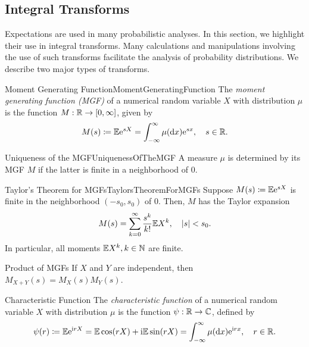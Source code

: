 \subsection{Integral Transforms}
Expectations are used in many probabilistic analyses. In this section, we highlight their use in integral transforms. Many calculations and manipulations involving the use of such transforms facilitate the analysis of probability distributions. We describe two major types of transforms.

\begin{defn}{Moment Generating Function}{MomentGeneratingFunction}
	The \textit{moment generating function (MGF)} of a numerical random variable $X$ with distribution $\mu$ is the function $M : \mathbb{R} \to [0, \infty]$, given by
	\begin{equation*}
		M(s) \coloneqq \mathbb{E} \mathrm{e}^{sX} = \int_{-\infty}^{\infty} \mu(\mathrm{d} x) \mathrm{e}^{sx}, \quad s \in \mathbb{R}.
	\end{equation*}
\end{defn}

\begin{thm}{Uniqueness of the MGF}{UniquenessOfTheMGF}
	A measure $\mu$ is determined by its MGF $M$ if the latter is finite in a neighborhood of $0$.
\end{thm}

\begin{thm}{Taylor's Theorem for MGFs}{TaylorsTheoremForMGFs}
	Suppose $M(s) \coloneqq \mathbb{E} \mathrm{e}^{sX}$ is finite in the neighborhood $(-s_0, s_0)$ of $0$. Then, $M$ has the Taylor expansion
	\begin{equation*}
		M(s) = \sum_{k=0}^{\infty} \frac{s^k}{k!} \mathbb{E} X^k, \quad |s| < s_0.
	\end{equation*}
	In particular, all moments $\mathbb{E} X^k, k \in \mathbb{N}$ are finite.
\end{thm}

\begin{thm}{Product of MGFs}{}
	If $X$ and $Y$ are independent, then $M_{X+Y}(s) = M_X(s) M_Y(s)$.
\end{thm}

\begin{defn}{Characteristic Function}{}
	The \textit{characteristic function} of a numerical random variable $X$ with distribution $\mu$ is the function $\psi : \mathbb{R} \to \mathbb{C}$, defined by
	\begin{equation*}
		\psi(r) \coloneqq \mathbb{E} \mathrm{e}^{\mathrm{i} r X} = \mathbb{E} \cos(r X) + \mathrm{i} \mathbb{E} \sin(r X) = \int_{-\infty}^{\infty} \mu(\mathrm{d} x) \mathrm{e}^{\mathrm{i} r x}, \quad r \in \mathbb{R}.
	\end{equation*}
\end{defn}

